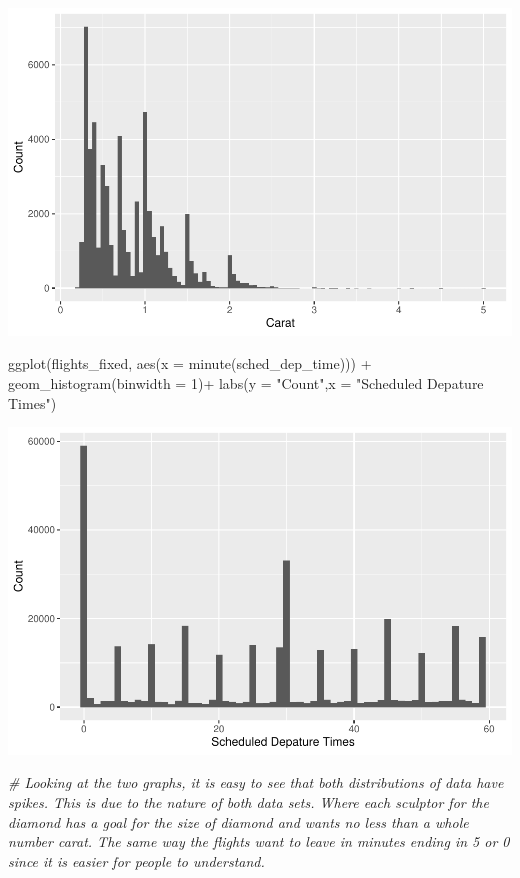 \documentclass[
]{article}
\newenvironment{Shaded}{\begin{snugshade}}{\end{snugshade}}
\newcommand{\AttributeTok}[1]{\textcolor[rgb]{0.77,0.63,0.00}{#1}}
\newcommand{\CommentTok}[1]{\textcolor[rgb]{0.56,0.35,0.01}{\textit{#1}}}
\newcommand{\DecValTok}[1]{\textcolor[rgb]{0.00,0.00,0.81}{#1}}
\newcommand{\FunctionTok}[1]{\textcolor[rgb]{0.00,0.00,0.00}{#1}}
\newcommand{\NormalTok}[1]{#1}
\newcommand{\SpecialCharTok}[1]{\textcolor[rgb]{0.00,0.00,0.00}{#1}}
\newcommand{\StringTok}[1]{\textcolor[rgb]{0.31,0.60,0.02}{#1}}
\begin{document}
\includegraphics{Midterm.sa_files/figure-latex/unnamed-chunk-8-1.pdf}

\begin{Shaded}
\begin{Highlighting}[]
\FunctionTok{ggplot}\NormalTok{(flights\_fixed, }\FunctionTok{aes}\NormalTok{(}\AttributeTok{x =} \FunctionTok{minute}\NormalTok{(sched\_dep\_time))) }\SpecialCharTok{+}
  \FunctionTok{geom\_histogram}\NormalTok{(}\AttributeTok{binwidth =} \DecValTok{1}\NormalTok{)}\SpecialCharTok{+}
  \FunctionTok{labs}\NormalTok{(}\AttributeTok{y =} \StringTok{"Count"}\NormalTok{,}\AttributeTok{x =} \StringTok{"Scheduled Depature Times"}\NormalTok{)}
\end{Highlighting}
\end{Shaded}

\includegraphics{Midterm.sa_files/figure-latex/unnamed-chunk-8-2.pdf}

\begin{Shaded}
\begin{Highlighting}[]
\CommentTok{\# Looking at the two graphs, it is easy to see that both distributions of data have spikes. This is due to the nature of both data sets. Where each sculptor for the diamond has a goal for the size of diamond and wants no less than a whole number carat. The same way the flights want to leave in minutes ending in 5 or 0 since it is easier for people to understand.}
\end{Highlighting}
\end{Shaded}
\end{document}
